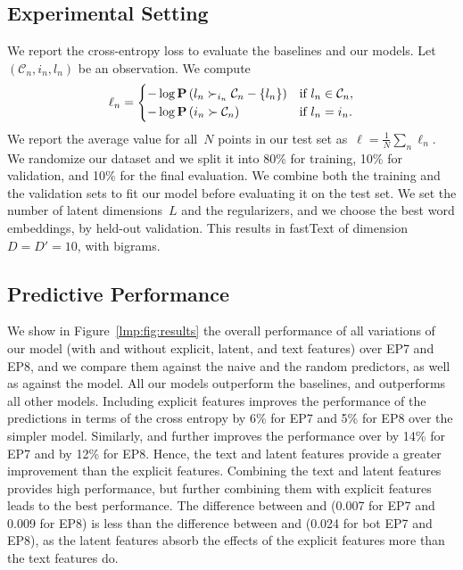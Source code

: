 \subsection{Experimental Setting}

We report the cross-entropy loss to evaluate the baselines and our models.
Let~$( \mathcal{C}_n, i_n, l_n )$ be an observation.
We compute
\begin{equation}
	\ell_n = \begin{cases}
		-\log \mathbf{P}\left( l_n \succ_{i_n} \mathcal{C}_n - \{l_n\}  \right) & \text{if $l_n \in \mathcal{C}_n$}, \\
		-\log \mathbf{P}\left( i_n \succ \mathcal{C}_n \right)                  & \text{if $l_n = i_n$}.
	\end{cases}
\end{equation}
We report the average value for all~$N$ points in our test set as~$\ell = \frac{1}{N} \sum_n \ell_n$.
We randomize our dataset and we split it into 80\% for training, 10\% for validation, and 10\% for the final evaluation.
We combine both the training and the validation sets to fit our model before evaluating it on the test set.
We set the number of latent dimensions~$L$ and the regularizers, and we choose the best word embeddings, by held-out validation.
This results in fastText of dimension~$D = D' = 10$, with bigrams.

\subsection{Predictive Performance}

We show in Figure~\ref{lmp:fig:results} the overall performance of all variations of our model (with and without explicit, latent, and text features) over EP7 and EP8, and we compare them against the naive and the random predictors, as well as against the \wow{} model.
All our models outperform the baselines, and  outperforms all other models.
Including explicit features improves the performance of the predictions in terms of the cross entropy by 6\% for EP7 and 5\% for EP8 over the simpler \wow{} model.
Similarly,  and  further improves the performance over \wow{} by 14\% for EP7 and by 12\% for EP8.
Hence, the text and latent features provide a greater improvement than the explicit features.
Combining the text and latent features provides high performance, but further combining them with explicit features leads to the best performance.
The difference between  and  (0.007 for EP7 and 0.009 for EP8) is less than the difference between  and  (0.024 for bot EP7 and EP8), as the latent features absorb the effects of the explicit features more than the text features do.

